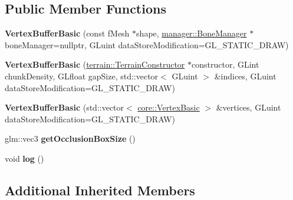 \subsection*{Public Member Functions}
\begin{DoxyCompactItemize}
\item 
\hypertarget{classfillwave_1_1core_1_1VertexBufferBasic_a5ee012cc91f995cae6bf6cbffc7d99b7}{}{\bfseries Vertex\+Buffer\+Basic} (const f\+Mesh $\ast$shape, \hyperlink{classfillwave_1_1manager_1_1BoneManager}{manager\+::\+Bone\+Manager} $\ast$bone\+Manager=nullptr, G\+Luint data\+Store\+Modification=G\+L\+\_\+\+S\+T\+A\+T\+I\+C\+\_\+\+D\+R\+A\+W)\label{classfillwave_1_1core_1_1VertexBufferBasic_a5ee012cc91f995cae6bf6cbffc7d99b7}

\item 
\hypertarget{classfillwave_1_1core_1_1VertexBufferBasic_a2845ece446fd0e68efa0f8c84640a566}{}{\bfseries Vertex\+Buffer\+Basic} (\hyperlink{classfillwave_1_1terrain_1_1TerrainConstructor}{terrain\+::\+Terrain\+Constructor} $\ast$constructor, G\+Lint chunk\+Density, G\+Lfloat gap\+Size, std\+::vector$<$ G\+Luint $>$ \&indices, G\+Luint data\+Store\+Modification=G\+L\+\_\+\+S\+T\+A\+T\+I\+C\+\_\+\+D\+R\+A\+W)\label{classfillwave_1_1core_1_1VertexBufferBasic_a2845ece446fd0e68efa0f8c84640a566}

\item 
\hypertarget{classfillwave_1_1core_1_1VertexBufferBasic_a1210e3b1c87f4021bff805aa993326c6}{}{\bfseries Vertex\+Buffer\+Basic} (std\+::vector$<$ \hyperlink{structfillwave_1_1core_1_1VertexBasic}{core\+::\+Vertex\+Basic} $>$ \&vertices, G\+Luint data\+Store\+Modification=G\+L\+\_\+\+S\+T\+A\+T\+I\+C\+\_\+\+D\+R\+A\+W)\label{classfillwave_1_1core_1_1VertexBufferBasic_a1210e3b1c87f4021bff805aa993326c6}

\item 
\hypertarget{classfillwave_1_1core_1_1VertexBufferBasic_a419bc14557eb854bcad0a486d2c7dd44}{}glm\+::vec3 {\bfseries get\+Occlusion\+Box\+Size} ()\label{classfillwave_1_1core_1_1VertexBufferBasic_a419bc14557eb854bcad0a486d2c7dd44}

\item 
\hypertarget{classfillwave_1_1core_1_1VertexBufferBasic_a13912a7dc1d40925935c2186ecd5a319}{}void {\bfseries log} ()\label{classfillwave_1_1core_1_1VertexBufferBasic_a13912a7dc1d40925935c2186ecd5a319}

\end{DoxyCompactItemize}
\subsection*{Additional Inherited Members}


